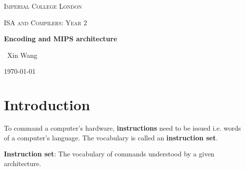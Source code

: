 \documentclass[10pt,a4paper]{article}
\begin{document}

\begin{titlepage}
	\centering
	{\scshape\LARGE Imperial College London \par}
	\vspace{1cm}
    {\scshape\Large ISA and Compilers: Year 2\par}
    \vspace{1.5cm}
	{\huge\bfseries Encoding and MIPS architecture \par}
	\vspace{2cm}
	{\Large\ Xin Wang }
	\vfill
	{\large \today\par}
\end{titlepage}


\begin{abstract}
    In computer science, an instruction set architecture (ISA) is an abstract model of a computer.
    It defines the supported data types, the registers, the hardware support for managing main
    memory, and the input/output model of a family of implementations of the ISA. Most importantly,
    it specifies the behavior of machine code running on implementations of that ISA.

    MIPS (Microprocessor without Interlocked Pipelined Stages) is a reduced instruction set computer
    (RISC) ISA developed by MIPS Technologies. Often studied in university as later architectures
    are influenced by the ISC architecture used in MIPS.
\end{abstract}


\tableofcontents
\pagebreak

\section{Introduction}

To command a computer’s hardware, \textbf{instructions} need to be issued i.e. words of a 
computer’s language. The vocabulary is called an \textbf{instruction set}.

\begin{tcolorbox}[breakable,colback=white]
\textbf{Instruction set}: The vocabulary of commands understood by a given architecture.
\end{tcolorbox}
\end{document}
